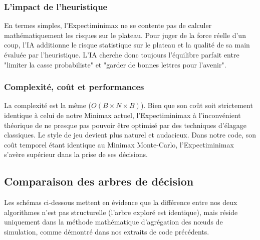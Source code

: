 \documentclass[a4paper]{article}
\begin{document}
    \subsubsection{L'impact de l'heuristique}
    En termes simples, l'Expectiminimax ne se contente pas de calculer mathématiquement les risques sur le plateau. Pour juger de la force réelle d'un coup, l'IA additionne le risque statistique sur le plateau et la qualité de sa main évaluée par l'heuristique. L'IA cherche donc toujours l'équilibre parfait entre "limiter la casse probabiliste" et "garder de bonnes lettres pour l'avenir".

    \subsubsection{Complexité, coût et performances}
    La complexité est la même ($O(B \times N \times B)$). Bien que son coût soit strictement identique à celui de notre Minimax actuel, l'Expectiminimax à l'inconvénient théorique de ne presque pas pouvoir être optimisé par des techniques d'élagage classiques. Le style de jeu devient plus naturel et audacieux. Dans notre code, son coût temporel étant identique au Minimax Monte-Carlo, l'Expectiminimax s'avère supérieur dans la prise de ses décisions.

    \subsection{Comparaison des arbres de décision}

    Les schémas ci-dessous mettent en évidence que la différence entre nos deux algorithmes n'est pas structurelle (l'arbre exploré est identique), mais réside uniquement dans la méthode mathématique d'agrégation des nœuds de simulation, comme démontré dans nos extraits de code précédents.
\end{document}
